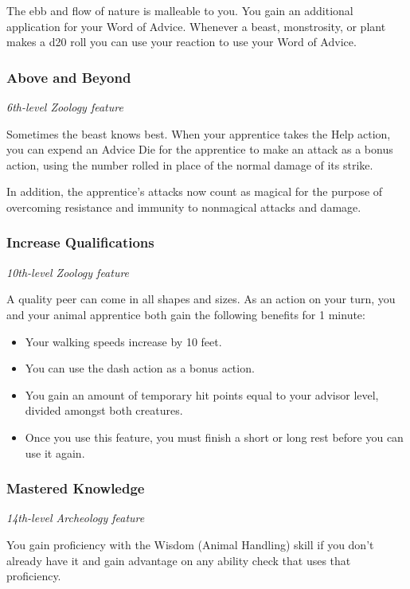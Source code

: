 \documentclass[letterpaper,openany,twoside,twocolumn]{book}
\begin{document}
	The ebb and flow of nature is malleable to you. You gain an additional application for your Word of Advice. Whenever a beast, monstrosity, or plant makes a d20 roll you can use your reaction to use your Word of Advice.
	
	\subsubsection*{Above and Beyond}
	\textnormal{\textit{6th-level Zoology feature}}
	
	Sometimes the beast knows best. When your apprentice takes the Help action, you can expend an Advice Die for the apprentice to make an attack as a bonus action, using the number rolled in place of the normal damage of its strike.
	
	In addition, the apprentice's attacks now count as magical for the purpose of overcoming resistance and immunity to nonmagical attacks and damage.
	
	\subsubsection*{Increase Qualifications}
	\textnormal{\textit{10th-level Zoology feature}}
	
	A quality peer can come in all shapes and sizes. As an action on your turn, you and your animal apprentice both gain the following benefits for 1 minute:
	
	\begin{itemize}
		\item Your walking speeds increase by 10 feet.
		\item You can use the dash action as a bonus action.
		\item You gain an amount of temporary hit points equal to your advisor level, divided amongst both creatures.
		\item Once you use this feature, you must finish a short or long rest before you can use it again.
	\end{itemize}
	
	\subsubsection*{Mastered Knowledge}
	\textnormal{\textit{14th-level Archeology feature}}
	
	You gain proficiency with the Wisdom (Animal Handling) skill if you don’t already have it and gain advantage on any ability check that uses that proficiency.
	
\end{document}
